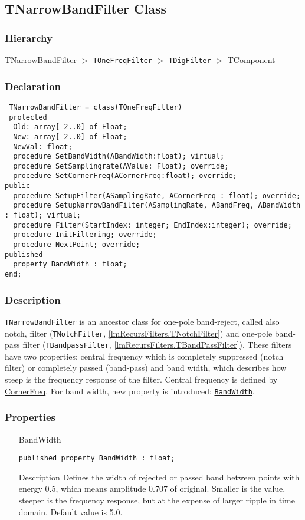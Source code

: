 \documentclass[12pt,a4paper,oneside]{report}
\newcommand{\descriptiontitle}[1]{{\addfontfeatures{FakeSlant}#1}}
\newcommand{\inlineitem}[1]{{\addfontfeatures{FakeBold} #1}}
\newcommand{\code}[1]{\texttt{#1}}
\begin{document}
\subsection{TNarrowBandFilter Class}
\label{lmRecursFilters.TNarrowBandFilter}
\subsubsection{Hierarchy}
TNarrowBandFilter {$>$} \hyperref[lmfilters.TOneFreqFilter]{\code{TOneFreqFilter}} {$>$} \hyperref[lmfilters.TDigFilter]{\code{TDigFilter}} {$>$} TComponent
\subsubsection{Declaration}
\begin{verbatim}
 TNarrowBandFilter = class(TOneFreqFilter)
 protected
  Old: array[-2..0] of Float;
  New: array[-2..0] of Float;
  NewVal: float;
  procedure SetBandWidth(ABandWidth:float); virtual;
  procedure SetSamplingrate(AValue: Float); override;
  procedure SetCornerFreq(ACornerFreq:float); override;
public
  procedure SetupFilter(ASamplingRate, ACornerFreq : float); override;
  procedure SetupNarrowBandFilter(ASamplingRate, ABandFreq, ABandWidth : float); virtual;
  procedure Filter(StartIndex: integer; EndIndex:integer); override;
  procedure InitFiltering; override;
  procedure NextPoint; override;
published
  property BandWidth : float;
end;
\end{verbatim}
\subsubsection{Description}
\code{TNarrowBandFilter} is an ancestor class for one-pole band-reject, called also notch, filter (\code{TNotchFilter},  \ref{lmRecursFilters.TNotchFilter}) and one-pole band-pass filter (\code{TBandpassFilter}, \ref{lmRecursFilters.TBandPassFilter}). These filters have two properties: central frequency which is completely suppressed (notch filter) or completely passed (band-pass) and band width, which describes how steep is the frequency response of the filter. Central frequency is defined by \hyperref[lmfilters.TOneFreqFilter-Cutfreq1]{CornerFreq}. For band width, new property is introduced: \hyperref[lmRecursFilters.TNarrowBandFilter-BandWidth]{\code{BandWidth}}.    
\subsubsection{Properties}
\begin{itemize}\label{lmRecursFilters.TNarrowBandFilter-BandWidth}
	\item[\inlineitem{BandWidth}\hfill]
	\begin{flushleft}
		\code{published property BandWidth : float;}
	\end{flushleft}
	\item[\descriptiontitle{Description}\hfill] Defines the width of rejected or passed band between points with energy 0.5, which means amplitude 0.707 of original. Smaller is the value, steeper is the frequency response, but at the expense of larger ripple in time domain. Default value is 5.0. 
	\end{itemize}
\end{document}
